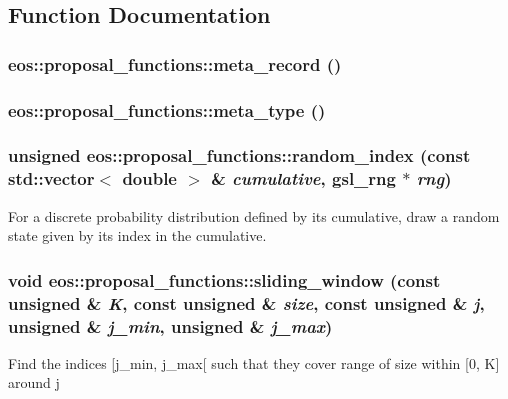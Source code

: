 \subsection{Function Documentation}
\hypertarget{namespaceeos_1_1proposal__functions_aa2f7d6804a251f162c263056d0e660e0}{
\subsubsection[{meta\_\-record}]{ eos::proposal\_\-functions::meta\_\-record ()}}
\label{namespaceeos_1_1proposal__functions_aa2f7d6804a251f162c263056d0e660e0}
\hypertarget{namespaceeos_1_1proposal__functions_ac169711c02c184c64ba3a406bd18598b}{
\subsubsection[{meta\_\-type}]{ eos::proposal\_\-functions::meta\_\-type ()}}
\label{namespaceeos_1_1proposal__functions_ac169711c02c184c64ba3a406bd18598b}
\hypertarget{namespaceeos_1_1proposal__functions_a55ba4d78e5beeb12699c697874f7c1df}{
\subsubsection[{random\_\-index}]{\setlength{\rightskip}{0pt plus 5cm}unsigned eos::proposal\_\-functions::random\_\-index (const std::vector$<$ double $>$ \& {\em cumulative}, \/  gsl\_\-rng $\ast$ {\em rng})}}
\label{namespaceeos_1_1proposal__functions_a55ba4d78e5beeb12699c697874f7c1df}
For a discrete probability distribution defined by its cumulative, draw a random state given by its index in the cumulative. \hypertarget{namespaceeos_1_1proposal__functions_a3714de403c64ba76dcdb901f138f48de}{
\subsubsection[{sliding\_\-window}]{\setlength{\rightskip}{0pt plus 5cm}void eos::proposal\_\-functions::sliding\_\-window (const unsigned \& {\em K}, \/  const unsigned \& {\em size}, \/  const unsigned \& {\em j}, \/  unsigned \& {\em j\_\-min}, \/  unsigned \& {\em j\_\-max})}}
\label{namespaceeos_1_1proposal__functions_a3714de403c64ba76dcdb901f138f48de}
Find the indices \mbox{[}j\_\-min, j\_\-max\mbox{[} such that they cover range of size within \mbox{[}0, K\mbox{]} around j 